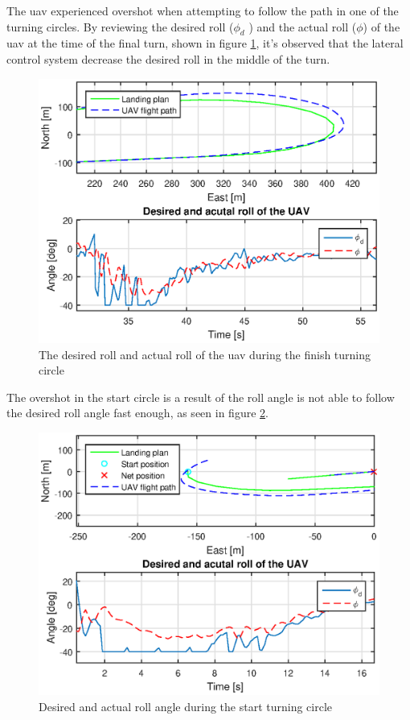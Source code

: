The \gls{uav} experienced overshot when attempting to follow the path in one of the turning circles. By reviewing the desired roll ($\phi_d$ ) and the actual roll ($\phi$) of the \gls{uav} at the time of the final turn, shown in figure \ref{Fig:DesiredRoll131844}, it's observed that the lateral control system decrease the desired roll in the middle of the turn.
\begin{figure}[H]
\centering
\includegraphics[scale=0.7]{figs/Experiment/rollDesired131844.eps}
\caption{The desired roll and actual roll of the \gls{uav} during the finish turning circle}
\label{Fig:DesiredRoll131844}
\end{figure}
The overshot in the start circle is a result of the roll angle is not able to follow the desired roll angle fast enough, as seen in figure \ref{Fig:Roll1juni081328}.
\begin{figure}[H]
\centering
\includegraphics[scale=0.7]{figs/Experiment/Roll1juni081328.eps}
\caption{Desired and actual roll angle during the start turning circle}
\label{Fig:Roll1juni081328}
\end{figure}
